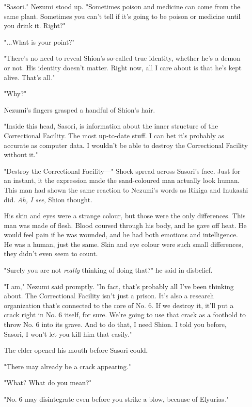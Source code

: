 "Sasori." Nezumi stood up. "Sometimes poison and medicine can come from
the same plant. Sometimes you can't tell if it's going to be poison or
medicine until you drink it. Right?"

"...What is your point?"

"There's no need to reveal Shion's so-called true identity, whether he's
a demon or not. His identity doesn't matter. Right now, all I care about
is that he's kept alive. That's all."

"Why?"

Nezumi's fingers grasped a handful of Shion's hair.

"Inside this head, Sasori, is information about the inner structure of
the Correctional Facility. The most up-to-date stuff. I can bet it's
probably as accurate as computer data. I wouldn't be able to destroy the
Correctional Facility without it."

"Destroy the Correctional Facility―" Shock spread across Sasori's face.
Just for an instant, it the expression made the sand-coloured man
actually look human. This man had shown the same reaction to Nezumi's
words as Rikiga and Inukashi did. \emph{Ah, I see}, Shion thought.

His skin and eyes were a strange colour, but those were the only
differences. This man was made of flesh. Blood coursed through his body,
and he gave off heat. He would feel pain if he was wounded, and he had
both emotions and intelligence. He was a human, just the same. Skin and
eye colour were such small differences, they didn't even seem to count.

"Surely you are not \emph{really} thinking of doing that?" he said in
disbelief.

"I am," Nezumi said promptly. "In fact, that's probably all I've been
thinking about. The Correctional Facility isn't just a prison. It's also
a research organization that's connected to the core of No. 6. If we
destroy it, it'll put a crack right in No. 6 itself, for sure. We're
going to use that crack as a foothold to throw No. 6 into its grave. And
to do that, I need Shion. I told you before, Sasori, I won't let you
kill him that easily."

The elder opened his mouth before Sasori could.

"There may already be a crack appearing."

"What? What do you mean?"

"No. 6 may disintegrate even before you strike a blow, because of
Elyurias."

